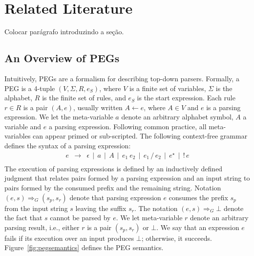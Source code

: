\chapter{Related Literature}\label{chap:review}

Colocar parágrafo introduzindo a seção.

\section{An Overview of PEGs}

Intuitively, PEGs are a formalism for describing top-down parsers.
Formally, a PEG is a 4-tuple \((V,\Sigma,R,e_S)\), where \(V\) is a 
finite set of variables, \(\Sigma\) is the alphabet, \(R\) is the finite 
set of rules, and \(e_S\) is the start expression. Each rule \(r \in R\) is a 
pair \((A,e)\), usually written \(A \leftarrow e\), where \(A \in V\) and \(e\) 
is a parsing expression. We let the meta-variable \(a\) denote an 
arbitrary alphabet symbol, \(A\) a variable and \(e\) a parsing expression. 
Following common practice, all meta-variables can appear primed or 
sub-scripted. The following context-free grammar defines
the syntax of a parsing expression:
\[
   \begin{array}{lcl}
      e & \to & \epsilon \, \mid \, a \, \mid \, A\, \mid \,e_1\:e_2\,
                  \mid\,e_1\,/\,e_2\, \mid \,e^\star\, \mid \,!\,e \\
   \end{array}
\]
The execution of parsing expressions is defined by an inductively defined
judgment that relates pairs formed by a parsing expression and an input string
to pairs formed by the consumed prefix and the remaining string.
Notation \((e,s) \Rightarrow_G (s_p,s_r)\) denote that parsing expression \(e\)
consumes the prefix \(s_p\) from the input string \(s\) leaving the suffix \(s_r\).
The notation \((e,s) \Rightarrow_G \bot\) denote the fact that \(s\) cannot be 
parsed by \(e\). We let meta-variable \(r\) denote an arbitrary parsing result, i.e.,
either \(r\) is a pair \((s_p,s_r)\) or \(\bot\). We say that an expression \(e\)
fails if its execution over an input produces \(\bot\); otherwise, it succeeds.
Figure~\ref{fig:pegsemantics} defines the PEG semantics.
